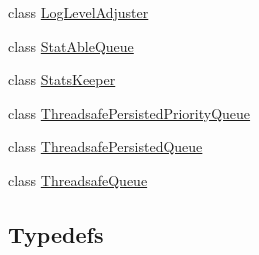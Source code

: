 \begin{DoxyCompactItemize}
\item 
class \hyperlink{classkisscpp_1_1_log_level_adjuster}{Log\-Level\-Adjuster}
\item 
class \hyperlink{classkisscpp_1_1_stat_able_queue}{Stat\-Able\-Queue}
\item 
class \hyperlink{classkisscpp_1_1_stats_keeper}{Stats\-Keeper}
\item 
class \hyperlink{classkisscpp_1_1_threadsafe_persisted_priority_queue}{Threadsafe\-Persisted\-Priority\-Queue}
\item 
class \hyperlink{classkisscpp_1_1_threadsafe_persisted_queue}{Threadsafe\-Persisted\-Queue}
\item 
class \hyperlink{classkisscpp_1_1_threadsafe_queue}{Threadsafe\-Queue}
\end{DoxyCompactItemize}
\subsection*{Typedefs}
